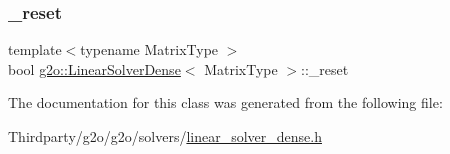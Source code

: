 \mbox{\label{classg2o_1_1_linear_solver_dense_a2d82ac52c9c24501cccee3ef3cb575fe}} 
\subsubsection{\texorpdfstring{\+\_\+reset}{\_reset}}
{\footnotesize\ttfamily template$<$typename Matrix\+Type $>$ \\
bool \mbox{\hyperlink{classg2o_1_1_linear_solver_dense}{g2o\+::\+Linear\+Solver\+Dense}}$<$ Matrix\+Type $>$\+::\+\_\+reset\hspace{0.3cm}{\ttfamily [protected]}}



The documentation for this class was generated from the following file\+:\begin{DoxyCompactItemize}
\item 
Thirdparty/g2o/g2o/solvers/\mbox{\hyperlink{linear__solver__dense_8h}{linear\+\_\+solver\+\_\+dense.\+h}}\end{DoxyCompactItemize}
